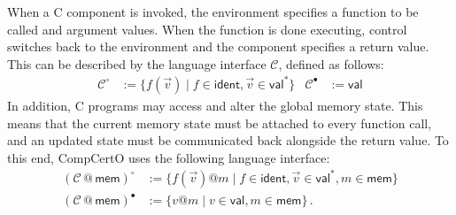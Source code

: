 \documentclass[acmsmall,screen,review,anonymous]{acmart}
\newcommand{\kw}[1]{\ensuremath{ \mathsf{#1} }}
\newcommand{\que}{\circ}
\newcommand{\ans}{\bullet}
\begin{document}
\begin{example} \label{ex:langint} %
When a C component is invoked,
the environment specifies a function to be called
and argument values.
When the function is done executing,
control switches back to the environment
and the component specifies a return value.
This can be described by the language interface $\mathcal{C}$,
defined as follows:
\begin{align*}
  \mathcal{C}^\que &:= \{ f(\vec{v}) \mid f \in \kw{ident}, \vec{v} \in \kw{val}^* \}
  &
  \mathcal{C}^\ans &:= \kw{val}
\end{align*}
In addition,
C programs may access and alter the global memory state.
This means that the current memory state must be attached
to every function call,
and an updated state must be communicated back
alongside the return value.
To this end, CompCertO uses the following language interface:
\begin{align*}
  (\mathcal{C} \mathbin@ \kw{mem})^\que &:=
    \{ f(\vec{v})@m \mid f \in \kw{ident}, \vec{v} \in \kw{val}^*, m \in \kw{mem} \}
  \\
  (\mathcal{C} \mathbin@ \kw{mem})^\ans &:=
    \{ v@m \mid v \in \kw{val}, m \in \kw{mem} \}
  \,.
\end{align*}
\end{example}


\end{document}
